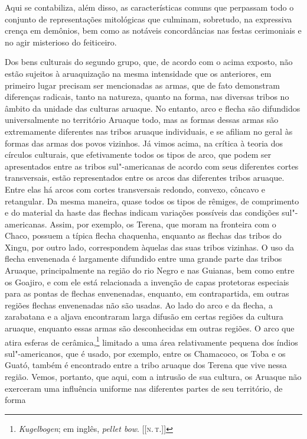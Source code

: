 Aqui se contabiliza, além disso, as características comuns que perpassam
todo o conjunto de representações mitológicas que culminam, sobretudo,
na expressiva crença em demônios, bem como as notáveis concordâncias nas
festas cerimoniais e no agir misterioso do feiticeiro.

Dos bens culturais do segundo grupo, que, de acordo com o acima exposto,
não estão sujeitos à aruaquização na mesma intensidade que os
anteriores, em primeiro lugar precisam ser mencionadas as armas, que de
fato demonstram diferenças radicais, tanto na natureza, quanto na
forma, nas diversas tribos no âmbito da unidade das culturas aruaque. No
entanto, arco e flecha são difundidos universalmente no território
Aruaque todo, mas as formas dessas armas são extremamente diferentes nas
tribos aruaque individuais, e se afiliam no geral às formas das armas
dos povos vizinhos. Já vimos acima, na crítica à teoria dos círculos
culturais, que efetivamente todos os tipos de arco, que podem ser
apresentados entre as tribos sul"-americanas de acordo com seus
diferentes cortes transversais, estão representados entre os arcos das
diferentes tribos aruaque. Entre elas há arcos com cortes transversais
redondo, convexo, côncavo e retangular. Da mesma maneira, quase todos
os tipos de rêmiges, de comprimento e do material da haste das flechas
indicam variações possíveis das condições sul"-americanas. Assim, por
exemplo, os Terena, que moram na fronteira com o Chaco, possuem a típica
flecha chaquenha, enquanto as flechas das tribos do Xingu, por outro
lado, correspondem àquelas das suas tribos vizinhas. O uso da flecha
envenenada é largamente difundido entre uma grande parte das tribos
Aruaque, principalmente na região do rio Negro e nas Guianas, bem como
entre os Goajiro, e com ele está relacionada a invenção de capas
protetoras especiais para as pontas de flechas envenenadas, enquanto,
em contrapartida, em outras regiões flechas envenenadas não são usadas.
Ao lado do arco e da flecha, a zarabatana e a aljava encontraram larga
difusão em certas regiões da cultura aruaque, enquanto essas armas são
desconhecidas em outras regiões. O arco que atira esferas de cerâmica,\footnote{
\emph{Kugelbogen}; em inglês, \emph{pellet bow}. {[}{[}\textsc{n.\,t.}{]}{]}} limitado a
uma área relativamente pequena dos índios sul"-americanos, que é usado,
por exemplo, entre os Chamacoco, os Toba e os Guató, também é encontrado
entre a tribo aruaque dos Terena que vive nessa região. Vemos, portanto,
que aqui, com a intrusão de sua cultura, os Aruaque não exerceram uma
influência uniforme nas diferentes partes de seu território, de forma
